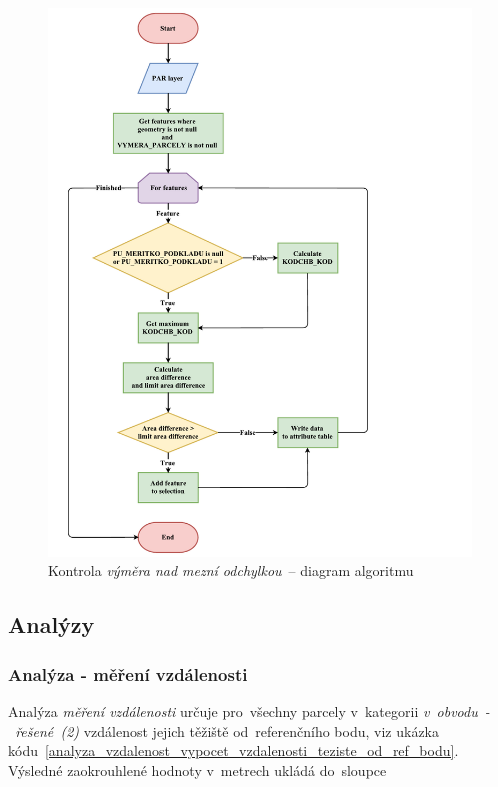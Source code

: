 	\begin{figure}[H]
		\centering
		\includegraphics[width=1.2\textwidth]{./pictures/vymera.pdf}
		\caption[Kontrola \textit{výměra nad mezní odchylkou}~– diagram algoritmu]{Kontrola \textit{výměra nad mezní odchylkou}~– diagram algoritmu}
		\label{fig:diagram_vymera}
 	\end{figure}

\subsection{Analýzy}
\label{analyzy}

\subsubsection{Analýza - měření vzdálenosti}
\label{analyza_vzdalenosti}

Analýza \textit{měření vzdálenosti} určuje pro~všechny parcely v~kategorii \textit{v~obvodu~-~řešené~(2)} vzdálenost jejich těžiště od~referenčního bodu, viz ukázka kódu~\ref{analyza_vzdalenost_vypocet_vzdalenosti_teziste_od_ref_bodu}. Výsledné zaokrouhlené hodnoty v~metrech ukládá do~sloupce \texttt{}

